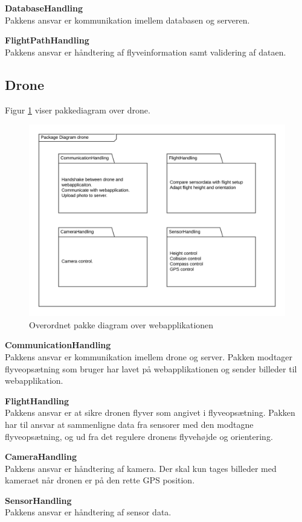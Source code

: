 \textbf{DatabaseHandling}\\
Pakkens ansvar er kommunikation imellem databasen og serveren. 

\textbf{FlightPathHandling}\\
Pakkens ansvar er håndtering af flyveinformation samt validering af dataen.




\newpage
\subsection{Drone}

Figur \ref{fig:pakke_diagram_drone} viser pakkediagram over drone. 

\vspace{-5pt}
\begin{figure}[H]
	\centering
	\includegraphics[width=1\textwidth]{Billeder/pakke_diagrammer/Gammel_drone.png}
	\vspace{-1cm}
	\caption{Overordnet pakke diagram over webapplikationen}
	\label{fig:pakke_diagram_drone}
\end{figure}

\textbf{CommunicationHandling}\\
Pakkens ansvar er kommunikation imellem drone og server. Pakken modtager flyveopsætning som bruger har lavet på webapplikationen og sender billeder til webapplikation.

\textbf{FlightHandling}\\
Pakkens ansvar er at sikre dronen flyver som angivet i flyveopsætning. Pakken har til ansvar at sammenligne data fra sensorer med den modtagne flyveopsætning, og ud fra det regulere dronens flyvehøjde og orientering. 

\textbf{CameraHandling}\\
Pakkens ansvar er håndtering af kamera. Der skal kun tages billeder med kameraet når dronen er på den rette GPS position. 

\textbf{SensorHandling}\\
Pakkens ansvar er håndtering af sensor data.
